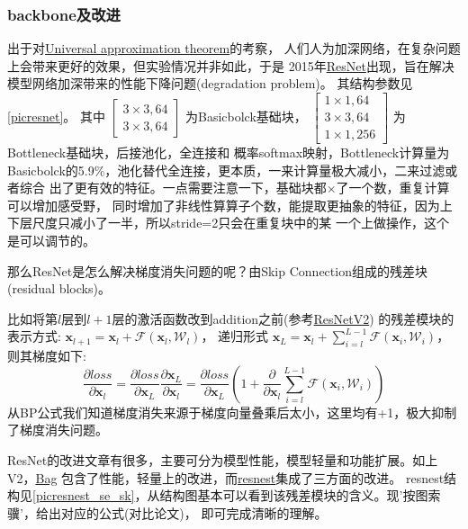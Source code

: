 \documentclass[UTF8]{ctexart}
\begin{document}
\subsubsection{backbone及改进}

出于对\href{https://en.wikipedia.org/wiki/Universal_approximation_theorem}{Universal approximation theorem}的考察，
人们人为加深网络，在复杂问题上会带来更好的效果，但实验情况并非如此，于是
2015年\href{https://arxiv.org/abs/1512.03385}{ResNet}出现，旨在解决模型网络加深带来的性能下降问题(degradation problem)。
其结构参数见\ref{picresnet}。
其中
$
\left[\begin{array}{l}
	3 \times 3,64 \\
	3 \times 3,64
\end{array}\right] 
$
为Basicbolck基础块，
$
\left[\begin{array}{c}
	1 \times 1,64 \\
	3 \times 3,64 \\
	1 \times 1,256
\end{array}\right] 
$
为Bottleneck基础块，后接池化，全连接和
概率softmax映射，Bottleneck计算量为Basicbolck的5.9\%，池化替代全连接，更本质，一来计算量极大减小，二来过滤或者综合
出了更有效的特征。一点需要注意一下，基础块都$\times$了一个数，重复计算可以增加感受野，
同时增加了非线性算算子个数，能提取更抽象的特征，因为上下层尺度只减小了一半，所以stride=2只会在重复块中的某
一个上做操作，这个是可以调节的。

那么ResNet是怎么解决梯度消失问题的呢？由Skip Connection组成的残差块(residual blocks)。

比如将第$l$层到$l+1$层的激活函数改到addition之前(参考\href{https://arxiv.org/abs/1603.05027}{ResNetV2})
的残差模块的表示方式:
$
\mathbf{x}_{l+1}=\mathbf{x}_{l}+\mathcal{F}\left(\mathbf{x}_{l}, \mathcal{W}_{l}\right)
$，
递归形式
$
\mathbf{x}_{L}=\mathbf{x}_{l}+\sum_{i=l}^{L-1} \mathcal{F}\left(\mathbf{x}_{i}, \mathcal{W}_{i}\right)
$，
则其梯度如下:
$$
\frac{\partial loss}{\partial \mathbf{x}_{l}}=\frac{\partial loss}{\partial \mathbf{x}_{L}}
 \frac{\partial \mathbf{x}_{L}}{\partial \mathbf{x}_{l}}=\frac{\partial loss}{\partial 
 \mathbf{x}_{L}}\left(1+\frac{\partial}{\partial \mathbf{x}_{l}} \sum_{i=l}^{L-1} 
 \mathcal{F}\left(\mathbf{x}_{i}, \mathcal{W}_{i}\right)\right)
$$
从BP公式我们知道梯度消失来源于梯度向量叠乘后太小，这里均有+1，极大抑制了梯度消失问题。

ResNet的改进文章有很多，主要可分为模型性能，模型轻量和功能扩展。如上V2，\href{https://arxiv.org/pdf/1812.01187.pdf}{Bag}
包含了性能，轻量上的改进，而\href{https://hangzhang.org/files/resnest.pdf}{resnest}集成了三方面的改进。
resnest结构见\ref{picresnest_se_sk}，从结构图基本可以看到该残差模块的含义。现'按图索骥'，给出对应的公式(对比论文)，
即可完成清晰的理解。
\end{document}
